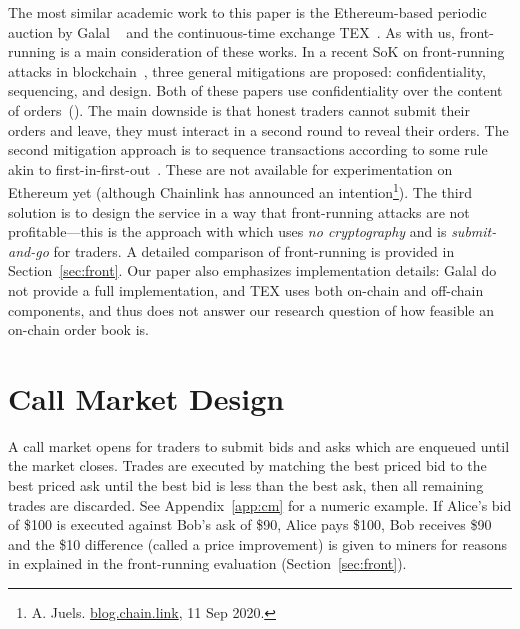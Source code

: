 The most similar academic work to this paper is the Ethereum-based periodic auction by Galal \etal~\cite{galalpublicly} and the continuous-time exchange TEX~\cite{khalil2019tex}. As with us, front-running is a main consideration of these works. In a recent SoK on front-running attacks in blockchain~\cite{eskandari2019sok}, three general mitigations are proposed: confidentiality, sequencing, and design. Both of these papers use confidentiality over the content of orders~(\cf \cite{TP07,YSLT10,TW12,cartlidge2019mpc,massacci2018futuresmex}). The main downside is that honest traders cannot submit their orders and leave, they must interact in a second round to reveal their orders. The second mitigation approach is to sequence transactions according to some rule akin to first-in-first-out~\cite{kelkar2020order,Kla20}. These are not available for experimentation on Ethereum yet (although Chainlink has announced an intention\footnote{A. Juels. \href{https://blog.chain.link/chainlink-fair-sequencing-services-enabling-a-provably-fair-defi-ecosystem/}{blog.chain.link}, 11 Sep 2020.}). The third solution is to design the service in a way that front-running attacks are not profitable---this is the approach with \cm which uses \textit{no cryptography} and is \textit{submit-and-go} for traders. A detailed comparison of front-running is provided in Section~\ref{sec:front}. Our paper also emphasizes implementation details: Galal \etal do not provide a full implementation, and TEX uses both on-chain and off-chain components, and thus does not answer our research question of how feasible an on-chain order book is.




\section{Call Market Design}



A call market opens for traders to submit bids and asks which are enqueued until the market closes. Trades are executed by matching the best priced bid to the best priced ask until the best bid is less than the best ask, then all remaining trades are discarded. See Appendix~\ref{app:cm} for a numeric example. If Alice's bid of \$100 is executed against Bob's ask of \$90, Alice pays \$100, Bob receives \$90 and the \$10 difference (called a price improvement) is given to miners for reasons in explained in the front-running evaluation (Section~\ref{sec:front}).

